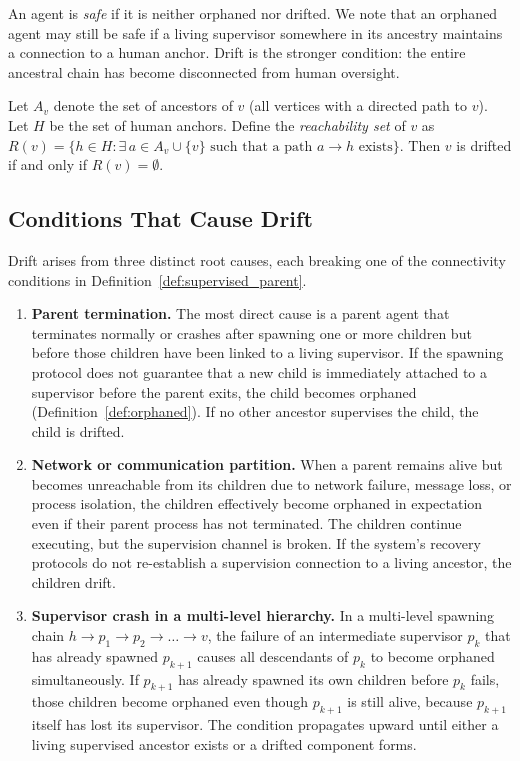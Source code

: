 An agent is \emph{safe} if it is neither orphaned nor drifted. We note that an orphaned agent may still be safe if a living supervisor somewhere in its ancestry maintains a connection to a human anchor. Drift is the stronger condition: the entire ancestral chain has become disconnected from human oversight.

Let $A_v$ denote the set of ancestors of $v$ (all vertices with a directed path to $v$). Let $H$ be the set of human anchors. Define the \emph{reachability set} of $v$ as $R(v) = \{ h \in H : \exists\, a \in A_v \cup \{v\} \text{ such that a path } a \to h \text{ exists} \}$. Then $v$ is drifted if and only if $R(v) = \emptyset$.

\subsection{Conditions That Cause Drift}

Drift arises from three distinct root causes, each breaking one of the connectivity conditions in Definition~\ref{def:supervised_parent}.

\begin{enumerate}
\item \textbf{Parent termination.} The most direct cause is a parent agent that terminates normally or crashes after spawning one or more children but before those children have been linked to a living supervisor. If the spawning protocol does not guarantee that a new child is immediately attached to a supervisor before the parent exits, the child becomes orphaned (Definition~\ref{def:orphaned}). If no other ancestor supervises the child, the child is drifted.

\item \textbf{Network or communication partition.} When a parent remains alive but becomes unreachable from its children due to network failure, message loss, or process isolation, the children effectively become orphaned in expectation even if their parent process has not terminated. The children continue executing, but the supervision channel is broken. If the system's recovery protocols do not re-establish a supervision connection to a living ancestor, the children drift.

\item \textbf{Supervisor crash in a multi-level hierarchy.} In a multi-level spawning chain $h \to p_1 \to p_2 \to \dots \to v$, the failure of an intermediate supervisor $p_k$ that has already spawned $p_{k+1}$ causes all descendants of $p_k$ to become orphaned simultaneously. If $p_{k+1}$ has already spawned its own children before $p_k$ fails, those children become orphaned even though $p_{k+1}$ is still alive, because $p_{k+1}$ itself has lost its supervisor. The condition propagates upward until either a living supervised ancestor exists or a drifted component forms.
\end{enumerate}

